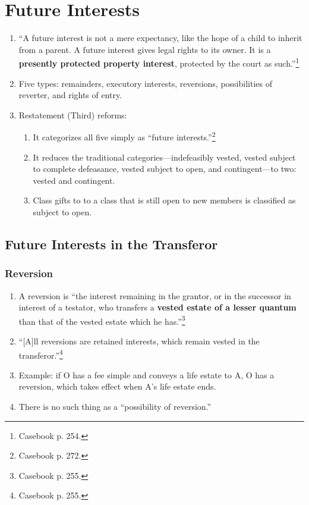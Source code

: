 \section{Future Interests}

\begin{enumerate}
    \item ``A future interest is not a mere expectancy, like the hope of a 
    child to inherit from a parent. A future interest gives legal rights to 
    its owner. It is a \textbf{presently protected property interest}, 
    protected by the court as such.''\footnote{Casebook p. 254.}
    \item Five types: remainders, executory interests, reversions, 
    possibilities of reverter, and rights of entry.
    \item Restatement (Third) reforms:
    \begin{enumerate}
        \item It categorizes all five simply as ``future 
        interests.''\footnote{Casebook p. 272.}
        \item It reduces the traditional categories---indefeasibly vested, 
        vested subject to complete defeasance, vested subject to open, and 
        contingent---to two: vested and contingent.
        \item Class gifts to to a class that is still open to new members is 
        classified as subject to open.
    \end{enumerate}
\end{enumerate}

\subsection{Future Interests in the Transferor}

\subsubsection{Reversion}

\begin{enumerate}
    \item A reversion is ``the interest remaining in the grantor, or in the 
    successor in interest of a testator, who transfers a \textbf{vested estate 
    of a lesser quantum} than that of the vested estate which he 
    has.''\footnote{Casebook p. 255.}
    \item ``[A]ll reversions are retained interests, which remain vested in 
    the transferor.''\footnote{Casebook p. 255.}
    \item Example: if O has a fee simple and conveys a life estate to A, O has 
    a reversion, which takes effect when A's life estate ends.
    \item There is no such thing as a ``possibility of reversion.''
\end{enumerate}


